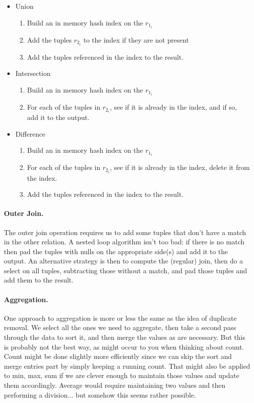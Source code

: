 \documentclass[a4paper]{report}
\begin{document}
\begin{itemize}
	\item Union
	\begin{enumerate}
		\item Build an in memory hash index on the $r_{1_{i}}$
		\item Add the tuples $r_{2_{i}}$ to the index if they are not present
		\item Add the tuples referenced in the index to the result.
	\end{enumerate}
	
	\item Intersection
	\begin{enumerate}
		\item Build an in memory hash index on the $r_{1_{i}}$
		\item For each of the tuples in $r_{2_{i}}$, see if it is already in the index, and if so, add it to the output.
	\end{enumerate}
	
	\item Difference
	\begin{enumerate}
		\item Build an in memory hash index on the $r_{1_{i}}$
		\item For each of the tuples in $r_{2_{i}}$, see if it is already in the index, delete it from the index.
		\item Add the tuples referenced in the index to the result.
	\end{enumerate}

\end{itemize}

\paragraph{Outer Join.}
The outer join operation requires us to add some tuples that don't have a match in the other relation. A nested loop algorithm isn't too bad: if there is no match then pad the tuples with nulls on the appropriate side(s) and add it to the output. An alternative strategy is then to compute the (regular) join, then do a select on all tuples, subtracting those without a match, and pad those tuples and add them to the result.

\paragraph{Aggregation.} One approach to aggregation is more or less the same as the idea of duplicate removal. We select all the ones we need to aggregate, then take a second pass through the data to sort it, and then merge the values as are necessary. But this is probably not the best way, as might occur to you when thinking about count. Count might be done slightly more efficiently since we can skip the sort and merge entries part by simply keeping a running count. That might also be applied to min, max, sum if we are clever enough to maintain those values and update them accordingly. Average would require maintaining two values and then performing a division... but somehow this seems rather possible.
\end{document}
